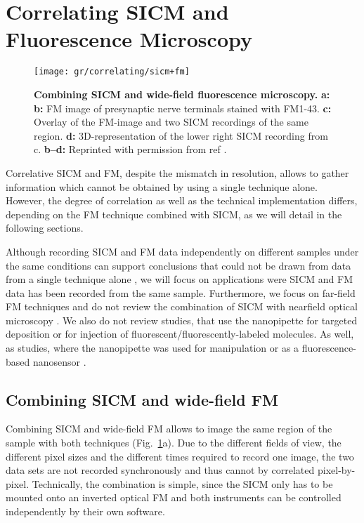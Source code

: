 \section{Correlating SICM and Fluorescence Microscopy}
\label{sec:correlating-sicm-and-fm}

\begin{figure}
  \texttt{[image: gr/correlating/sicm+fm]}
  \caption{%
    \textbf{Combining SICM and wide-field fluorescence microscopy.}
    \textbf{a:}
    \textbf{b:} FM image of presynaptic nerve terminals stained with
    FM1-43. \textbf{c:} Overlay of the FM-image and two SICM recordings of the
    same region. \textbf{d:} 3D-representation of the lower right SICM
    recording from c.
    \textbf{b--d:} Reprinted with permission from ref \cite{Scheenen2015}.
  }
  \label{fig:sicm+fm}
\end{figure}

Correlative SICM and FM, despite the mismatch in resolution, allows to gather
information which cannot be obtained by using a single technique
alone. However, the degree of correlation as well as the technical
implementation differs, depending on the FM technique combined with SICM, as
we will detail in the following sections.

Although recording SICM and FM data independently on different samples under
the same conditions can support conclusions that could not be drawn from data
from a single technique alone \cite{Gesper2017,Lee2013,Lyon2009}, we will
focus on applications were SICM and FM data has been recorded from the same
sample. Furthermore, we focus on far-field FM techniques and do not review the
combination of SICM with nearfield optical microscopy  
\cite{Korchev2000,Shevchuk2001,Rothery2003,Bruckbauer2002}. We also do not review
studies, that use the nanopipette for targeted deposition 
\cite{Ying2002,Bruckbauer2007,Bruckbauer2010,Hennig2015} or for injection 
\cite{Hennig2015a} of fluorescent/fluorescently-labeled molecules. As well, as studies, 
where the nanopipette was used for manipulation \cite{Fuentes2012,Wang2020} or as a 
fluorescence-based nanosensor \cite{Piper2006}.


\subsection{Combining SICM and wide-field FM}
\label{sec:SICM+widefield}
Combining SICM and wide-field FM allows to image the same region of the sample
with both techniques (Fig.~\ref{fig:sicm+fm}a). Due to the different fields of
view, the different pixel sizes and the different times required to record one
image, the two data sets are not recorded synchronously and thus cannot by
correlated pixel-by-pixel. Technically, the combination is simple, since
the SICM only has to be mounted onto an inverted optical FM and both
instruments can be controlled independently by their own software.

